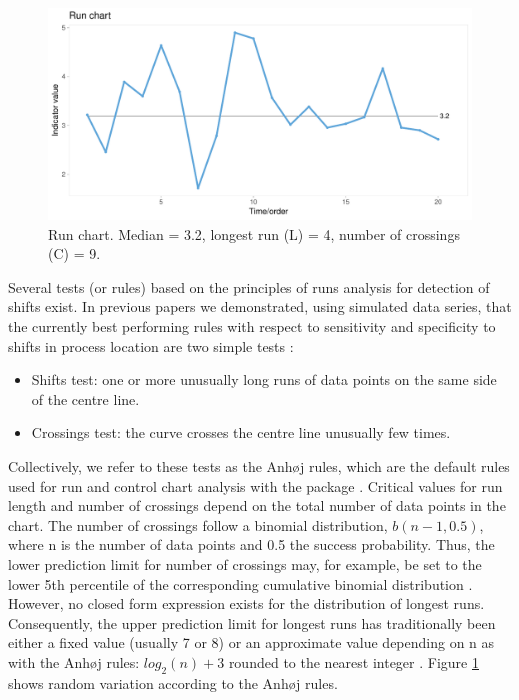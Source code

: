 \begin{figure}[htbp]
  \centering
  \includegraphics[width=\textwidth]{fig_run.pdf}
  \caption{Run chart. Median = 3.2, longest run (L) = 4, number of crossings (C) = 9.}
  \label{figure:run}
\end{figure}

Several tests (or rules) based on the principles of runs analysis for
detection of shifts exist. In previous papers we demonstrated, using
simulated data series, that the currently best performing rules with
respect to sensitivity and specificity to shifts in process location are
two simple tests \citep{anhoej2014, anhoej2015, anhoej2018}:

\begin{itemize}
\item
  Shifts test: one or more unusually long runs of data points on the
  same side of the centre line.
\item
  Crossings test: the curve crosses the centre line unusually few times.
\end{itemize}

Collectively, we refer to these tests as the Anhøj rules, which are the
default rules used for run and control chart analysis with the
 package \citep{qicharts2}. Critical values for run
length and number of crossings depend on the total number of data points
in the chart. The number of crossings follow a binomial distribution,
\(b(n - 1, 0.5)\), where n is the number of data points and 0.5 the
success probability. Thus, the lower prediction limit for number of
crossings may, for example, be set to the lower 5th percentile of the
corresponding cumulative binomial distribution \citep{chen2010}.
However, no closed form expression exists for the distribution of
longest runs. Consequently, the upper prediction limit for longest runs
has traditionally been either a fixed value (usually 7 or 8)
\citep{carey2002a} or an approximate value depending on n as with the
Anhøj rules: \(log_2(n) + 3\) rounded to the nearest integer
\citep{schilling2012}. Figure \ref{figure:run} shows random variation
according to the Anhøj rules.

